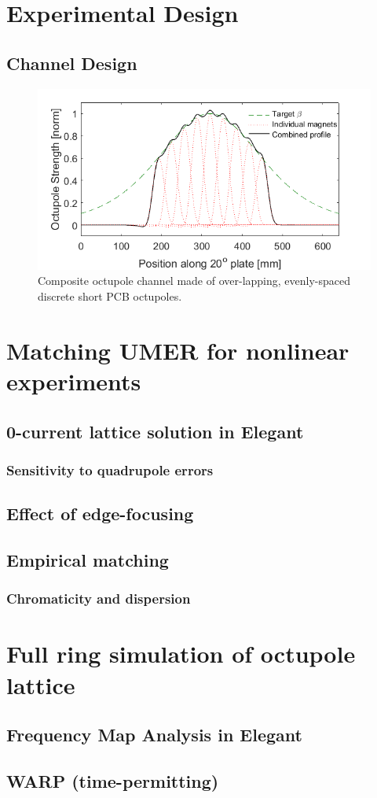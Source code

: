 
 

  
 \section{Experimental Design}
 \subsection{Channel Design}
 
\begin{figure}[]
\centering
\includegraphics[width=\textwidth]{5.figures/long_channel_N9_cleanedup.png}   
\caption{Composite octupole channel made of over-lapping, evenly-spaced discrete short PCB octupoles.}
\label{fig:octchannel}
\end{figure}  



\section{Matching UMER for nonlinear experiments}
\subsection{0-current lattice solution in Elegant}
\subsubsection{Sensitivity to quadrupole errors}
\subsection{Effect of edge-focusing}
\subsection{Empirical matching}
\subsubsection{Chromaticity and dispersion}





\section{Full ring simulation of octupole lattice}
\subsection{Frequency Map Analysis in Elegant}
\subsection{WARP (time-permitting)}

